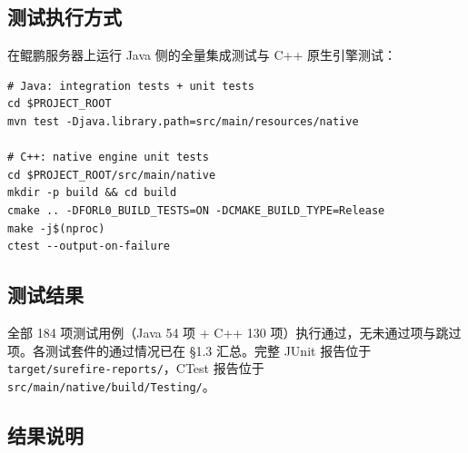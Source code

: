 \documentclass[a4paper,11pt]{article}
\begin{document}
\subsection{测试执行方式}

在鲲鹏服务器上运行 Java 侧的全量集成测试与 C++ 原生引擎测试：

\begin{lstlisting}[language=shellcmd]
# Java: integration tests + unit tests
cd $PROJECT_ROOT
mvn test -Djava.library.path=src/main/resources/native

# C++: native engine unit tests
cd $PROJECT_ROOT/src/main/native
mkdir -p build && cd build
cmake .. -DFORL0_BUILD_TESTS=ON -DCMAKE_BUILD_TYPE=Release
make -j$(nproc)
ctest --output-on-failure
\end{lstlisting}

\subsection{测试结果}

全部 184 项测试用例（Java 54 项 + C++ 130 项）执行通过，无未通过项与跳过项。各测试套件的通过情况已在 \S1.3 汇总。完整 JUnit 报告位于 \texttt{target/surefire-reports/}，CTest 报告位于 \texttt{src/main/native/build/Testing/}。

\subsection{结果说明}
\end{document}
